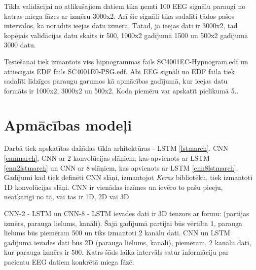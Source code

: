 \documentclass[12pt,paper=A4]{report}
\begin{document}
Tīkla validācijai no atlikušajiem datiem tika ņemti 100 EEG signālu paraugi no katras miega fāzes ar izmēru 3000x2. Arī šie signāli tika sadalīti tādos pašos intervālos, kā norādīts ieejas datu izmērā. Tātad, ja ieejas dati ir 3000x2, tad kopējais validācijas datu skaits ir 500, 1000x2 gadījumā 1500 un 500x2 gadījumā 3000 datu. 

Testēšanai tiek izmantots viss hipnogrammas fails SC4001EC-Hypnogram.edf un attiecīgais EDF fails SC4001E0-PSG.edf. Abi EEG signāli no EDF faila tiek sadalīti līdzīgos paraugu garumos kā apmācības gadījumā, kur ieejas datu formāts ir 1000x2, 3000x2 un 500x2. Koda piemēru var apskatīt pielikumā 5.. 


  
 
\section{Apmācības modeļi}

Darbā tiek apskatītas dažādas tīkla arhitektūras - LSTM \ref{lstmarch}, CNN \ref{cnnmarch}, CNN ar 2 konvolūcijas slāņiem, kas apvienots ar LSTM \ref{cnn2lstmarch} un CNN ar 8 slāņiem, kas apvienots ar LSTM \ref{cnn8lstmarch}. Gadījumi kad tiek definēti CNN slāņi, izmantojot \textit{Keras} bibliotēku, tiek izmantoti 1D konvolūcijas slāņi. CNN ir vienādas iezīmes un ievēro to pašu pieeju, neatkarīgi no tā, vai tas ir 1D, 2D vai 3D. 

CNN-2 - LSTM un CNN-8 - LSTM ievades dati ir 3D tenzors ar formu: (partijas izmērs, parauga lielums, kanāli). Šajā gadījumā partijai būs vērtība 1, parauga lielums būs piemēram 500 un tiks izmantoti 2 kanālu dati. CNN un LSTM gadījumā ievades dati būs 2D (parauga lielums, kanāli), piemēram, 2 kanālu dati, kur parauga izmērs ir 500. Katrs šāds laika intervāls satur informāciju par pacientu EEG datiem konkrētā miega fāzē.
\end{document}
